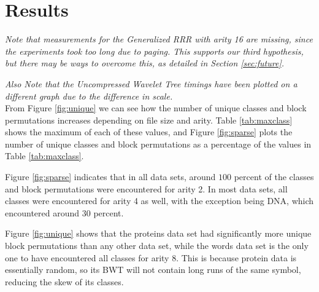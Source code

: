 \section{Results}
\label{sec:results}
\emph{Note that measurements for the Generalized RRR with arity 16 are missing, 
since the experiments took too long due to paging. This supports our third 
hypothesis, but there may be ways to overcome this, as detailed in Section 
\ref{sec:future}.}

\emph{Also Note that the Uncompressed Wavelet Tree timings have been plotted on 
a different graph due to the difference in scale.}\\



From Figure \ref{fig:unique} we can see how the number of unique classes and 
block permutations increases depending on file size and arity. Table 
\ref{tab:maxclass} shows the maximum of each of these values, and Figure 
\ref{fig:sparse} plots the number of unique classes and block permutations as
a percentage of the values in Table \ref{tab:maxclass}.

Figure \ref{fig:sparse} indicates that in all data sets, around $100$ percent of
the classes and block permutations were encountered for arity 2. In most data
sets, all classes were encountered for arity 4 as well, with the exception being 
DNA, which encountered around $30$ percent.

Figure \ref{fig:unique} shows that the proteins data set had significantly more
unique block permutations than any other data set, while the words data set is 
the only one to have encountered all classes for arity 8. This is because 
protein data is essentially random, so its BWT will not contain long runs of the 
same symbol, reducing the skew of its classes.

